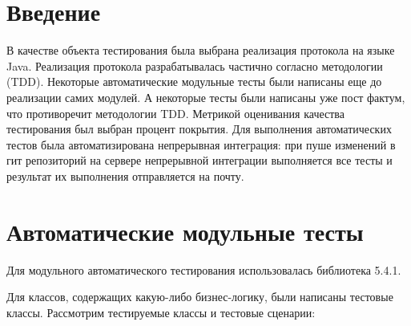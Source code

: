 





\tableofcontents
\newpage

\section{Введение}

В качестве объекта тестирования была выбрана реализация протокола  на языке Java. Реализация протокола  разрабатывалась частично согласно методологии  (TDD). Некоторые автоматические модульные тесты были написаны еще до реализации самих модулей. А некоторые тесты были написаны уже пост фактум, что противоречит методологии TDD. Метрикой оценивания качества тестирования был выбран процент покрытия. Для выполнения автоматических тестов была автоматизирована непрерывная интеграция: при пуше изменений в гит репозиторий на сервере непрерывной интеграции выполняется все тесты и результат их выполнения отправляется на почту.

\section{Автоматические модульные тесты}

Для модульного автоматического тестирования использовалась библиотека  5.4.1.

Для классов, содержащих какую-либо бизнес-логику, были написаны тестовые классы. Рассмотрим тестируемые классы и тестовые сценарии:


